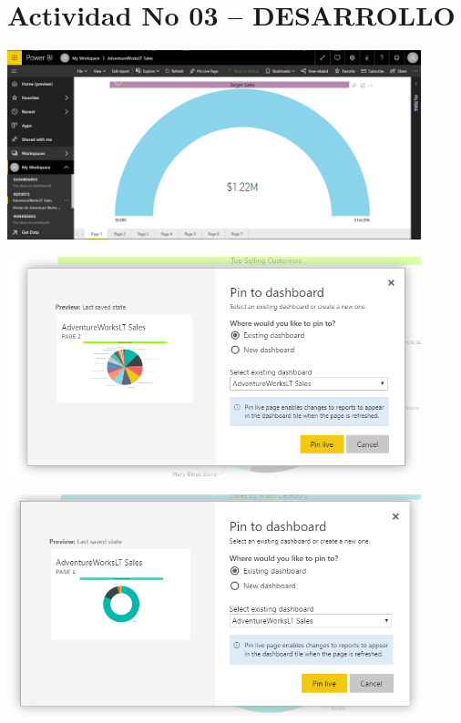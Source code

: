 \section{Actividad No 03 – DESARROLLO} 



	\begin{center}
	\includegraphics[width=12cm]{./Imagenes/31.png}
	\end{center}	
\begin{center}
	\includegraphics[width=12cm]{./Imagenes/32.png}
	\end{center}	

	
\begin{center}
	\includegraphics[width=12cm]{./Imagenes/33.png}
	\end{center}	

	

	